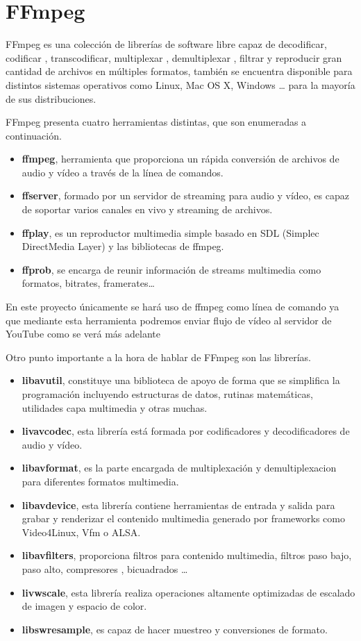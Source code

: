 \section{FFmpeg}

FFmpeg es una colección de librerías de software libre capaz de decodificar, codificar , transcodificar, multiplexar , demultiplexar , filtrar y reproducir gran cantidad de archivos en múltiples formatos, también se encuentra disponible para distintos sistemas operativos como Linux, Mac OS X, Windows … para la mayoría de sus distribuciones.

FFmpeg presenta cuatro herramientas distintas, que son enumeradas a continuación.

\begin{itemize}

\item \textbf{ffmpeg}, herramienta que proporciona un rápida conversión de archivos de audio y vídeo a través de la línea de comandos.
\item \textbf{ffserver}, formado por un servidor de streaming para audio y vídeo, es capaz de soportar varios canales en vivo y streaming de archivos.
\item \textbf{ffplay}, es un reproductor multimedia simple basado en SDL (Simplec DirectMedia Layer) y las bibliotecas de ffmpeg.
\item \textbf{ffprob}, se encarga de reunir información de streams multimedia como formatos, bitrates, framerates…
\end{itemize}

En este proyecto únicamente se hará uso de ffmpeg como línea de comando ya que mediante esta herramienta podremos enviar flujo de vídeo al servidor de YouTube como se verá más adelante

Otro punto importante a la hora de hablar de FFmpeg son las librerías.

\begin{itemize}
    \item \textbf{libavutil}, constituye una biblioteca de apoyo de forma que se simplifica la programación incluyendo estructuras de datos, rutinas matemáticas, utilidades capa multimedia y otras muchas.
    \item \textbf{livavcodec}, esta librería está formada por codificadores y decodificadores de audio y vídeo.
    \item \textbf{libavformat}, es la parte encargada de multiplexación y demultiplexacion para diferentes formatos multimedia.
    \item \textbf{libavdevice}, esta librería contiene herramientas de entrada y salida para grabar y renderizar el contenido multimedia generado por frameworks como Video4Linux, Vfm o ALSA.
    \item \textbf{libavfilters}, proporciona filtros para contenido multimedia, filtros paso bajo, paso alto, compresores , bicuadrados …
    \item \textbf{livwscale}, esta librería realiza operaciones altamente optimizadas de escalado de imagen y espacio de color.
    \item \textbf{libswresample},  es capaz de hacer muestreo y conversiones de formato.
\end{itemize}

